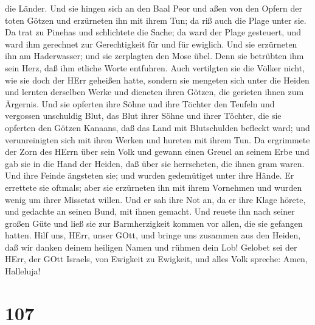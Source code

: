 die Länder.  Und sie hingen sich an den Baal Peor und aßen
von den Opfern der toten Götzen  und erzürneten ihn mit
ihrem Tun; da riß auch die Plage unter sie.  Da trat zu
Pinehas und schlichtete die Sache; da ward der Plage gesteuert,
 und ward ihm gerechnet zur Gerechtigkeit für und für
ewiglich.  Und sie erzürneten ihn am Haderwasser; und sie
zerplagten den Mose übel.  Denn sie betrübten ihm sein
Herz, daß ihm etliche Worte entfuhren.  Auch vertilgten sie
die Völker nicht, wie sie doch der HErr geheißen hatte, 
sondern sie mengeten sich unter die Heiden und lernten derselben Werke
 und dieneten ihren Götzen, die gerieten ihnen zum
Ärgernis.  Und sie opferten ihre Söhne und ihre Töchter den
Teufeln  und vergossen unschuldig Blut, das Blut ihrer
Söhne und ihrer Töchter, die sie opferten den Götzen Kanaans, daß das
Land mit Blutschulden befleckt ward;  und verunreinigten
sich mit ihren Werken und hureten mit ihrem Tun.  Da
ergrimmete der Zorn des HErrn über sein Volk und gewann einen Greuel an
seinem Erbe  und gab sie in die Hand der Heiden, daß über
sie herrscheten, die ihnen gram waren.  Und ihre Feinde
ängsteten sie; und wurden gedemütiget unter ihre Hände.  Er
errettete sie oftmals; aber sie erzürneten ihn mit ihrem Vornehmen und
wurden wenig um ihrer Missetat willen.  Und er sah ihre Not
an, da er ihre Klage hörete,  und gedachte an seinen Bund,
mit ihnen gemacht. Und reuete ihn nach seiner großen Güte 
und ließ sie zur Barmherzigkeit kommen vor allen, die sie gefangen
hatten.  Hilf uns, HErr, unser GOtt, und bringe uns
zusammen aus den Heiden, daß wir danken deinem heiligen Namen und rühmen
dein Lob!  Gelobet sei der HErr, der GOtt Israels, von
Ewigkeit zu Ewigkeit, und alles Volk spreche: Amen, Halleluja!

\hypertarget{section-106}{%
\section{107}\label{section-106}}

